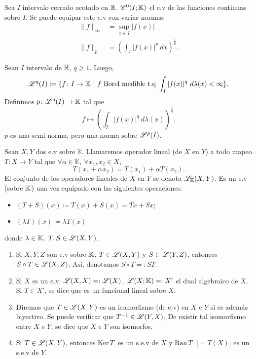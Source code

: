 
\begin{eg}
	Sea $I$ intervalo cerrado acotado en $\mathbb{R}$. $\mathscr{C}^{0}(I;\mathbb{K})$ el e.v de las funciones continuas sobre $I$. Se puede equipar este e.v con varias normas:
	\begin{align*}
		\| f \|_{\infty} &= \sup_{x \in I} |f(x)| \\
		\| f \|_{p} &= \left( \int_{I} |f(x)|^{p} \ dx \right)^{\frac{1}{p}}
	.\end{align*}
\end{eg}

\begin{eg}
	Sean $I$ intervalo de $\mathbb{R}$, $q \geq 1$. Luego,
	\[ \mathscr{L}^{q}(I) \coloneq \{f \colon I \to \mathbb{K} \ | \ f \text{ Borel medible t.q } \int_{I} |f(x)|^{q} \ d\lambda(x) < \infty\}. \] 
	Definimos $p \colon \mathscr{L}^{q}(I) \to \mathbb{R}$ tal que
	\[ f \mapsto \left( \int_{I} |f(x)|^{q} \ d\lambda(x) \right)^{\frac{1}{q}}. \]
	$p$ es una semi-norma, pero una norma sobre $\mathscr{L}^{p}(I)$.
\end{eg}

\begin{definition}
	Sean $X,Y$ dos e.v sobre $\mathbb{K}$. Llamaremos operador lineal (de $X$ en $Y$) a todo mapeo $T \colon X \to Y$ tal que $\forall \alpha \in \mathbb{K},\ \forall x_{1},x_{2} \in X$,
	\[ T(x_{1} + \alpha x_{2}) = T(x_{1}) + \alpha T(x_{2}). \]
	El conjunto de los operadores lineales de $X$ en $Y$ se denota $\mathscr{L}_{\mathbb{K}}(X,Y)$. Es un e.v (sobre $\mathbb{K}$) una vez equipado con las siguientes operaciones:
	\begin{itemize}
		\item $(T + S)(x) \coloneq T(x) + S(x) = Tx + Sx$;

		\item $(\lambda T)(x) \coloneq \lambda T(x)$
	\end{itemize}
	donde $\lambda \in \mathbb{K},\ T,S \in \mathscr{L}(X,Y)$.
\end{definition}

\begin{observe}[a)]
	\begin{enumerate}
		\item Si $X,Y,Z$ son e.v sobre $\mathbb{K}$, $T \in \mathscr{L}(X,Y)$ y $S \in \mathscr{L}(Y,Z)$, entonces $S \circ T \in \mathscr{L}(X,Z)$. Así, denotamos $S \circ T =: ST$.

		\item Si $X$ es un e.v: $\mathscr{L}(X,X) =: \mathscr{L}(X)$, $\mathscr{L}(X; \mathbb{K}) =: X'$ el dual algebraico de $X$. Si $T \in X'$, se dice que es un funcional lineal sobre $X$.

		\item Diremos que $T \in \mathscr{L}(X,Y)$ es un isomorfismo (de e.v) en $X$ e $Y$ si es además biyectivo. Se puede verificar que $T^{-1} \in \mathscr{L}(Y,X)$. De existir tal isomorfismo entre $X$ e $Y$, se dice que $X$ e $Y$ son isomorfos.

		\item Si $T \in \mathscr{L}(X,Y)$, entonces $\operatorname{Ker} T$ es un s.e.v de $X$ y $\operatorname{Ran} T$ [$= T(X)$] es un s.e.v de $Y$.
	\end{enumerate}
\end{observe}


